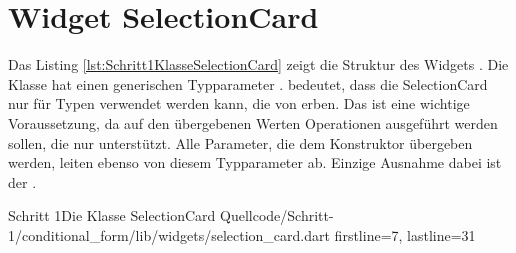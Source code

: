 
\ifIncludeFigures \clearpage \fi

\section{Widget SelectionCard}

Das Listing \ref{lst:Schritt1KlasseSelectionCard} zeigt die Struktur des Widgets .
Die Klasse hat einen generischen Typparameter .  bedeutet, dass die SelectionCard nur für Typen verwendet werden kann, die von  erben. Das ist eine wichtige Voraussetzung, da auf den übergebenen Werten Operationen ausgeführt werden sollen, die nur  unterstützt. Alle Parameter, die dem Konstruktor übergeben werden, leiten ebenso von diesem Typparameter ab. Einzige Ausnahme dabei ist der  .  

\begin{alexlisting}{Schritt 1}{Die Klasse SelectionCard}
  {Quellcode/Schritt-1/conditional_form/lib/widgets/selection_card.dart}
  {firstline=7, lastline=31}
  \label{lst:Schritt1KlasseSelectionCard}
\end{alexlisting}

